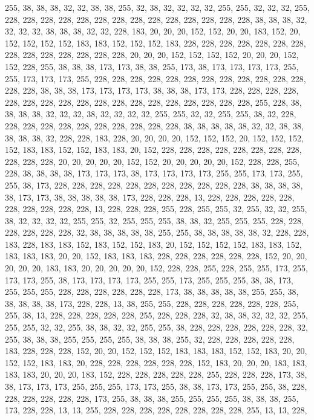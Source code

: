 {	255, 38,  38,  38,  32,  32,  38,  38,  255, 32,  38,  32,  32,  32,  32,  255, 255, 32,  32,  32,  255, 228, 228, 228, 228, 228, 228, 228, 228, 228, 228, 228, 228, 228, 228, 38,  38,  38,  32,  32,  32,  32,  38,  38,  38,  32,  32,  228, 183, 20,  20,  20,  152, 152, 20,  20,  183, 152, 20,  152, 152, 152, 152, 183, 183, 152, 152, 152, 183, 228, 228, 228, 228, 228, 228, 228, 228, 228, 228, 228, 228, 228, 228, 20,  20,  20,  152, 152, 152, 152, 20,  20,  20,  152, 152, 228, 255, 38,  38,  38,  173, 173, 38,  38,  255, 173, 38,  173, 173, 173, 173, 255, 255, 173, 173, 173, 255, 228, 228, 228, 228, 228, 228, 228, 228, 228, 228, 228, 228, 228, 228, 38,  38,  38,  173, 173, 173, 173, 38,  38,  38,  173, 173, 228, 228, 228, 228, 228, 228, 228, 228, 228, 228, 228, 228, 228, 228, 228, 228, 228, 
	228, 255, 228, 38,  38,  38,  38,  32,  32,  32,  38,  32,  32,  32,  32,  255, 255, 32,  32,  255, 255, 38,  32,  228, 228, 228, 228, 228, 228, 228, 228, 228, 228, 228, 38,  38,  38,  38,  38,  32,  32,  38,  38,  38,  38,  38,  32,  228, 228, 183, 228, 20,  20,  20,  20,  152, 152, 152, 20,  152, 152, 152, 152, 183, 183, 152, 152, 183, 183, 20,  152, 228, 228, 228, 228, 228, 228, 228, 228, 228, 228, 228, 20,  20,  20,  20,  20,  152, 152, 20,  20,  20,  20,  20,  152, 228, 228, 255, 228, 38,  38,  38,  38,  173, 173, 173, 38,  173, 173, 173, 173, 255, 255, 173, 173, 255, 255, 38,  173, 228, 228, 228, 228, 228, 228, 228, 228, 228, 228, 228, 38,  38,  38,  38,  38,  173, 173, 38,  38,  38,  38,  38,  173, 228, 228, 228, 13,  228, 228, 228, 228, 228, 228, 228, 228, 228, 228, 13,  228, 228, 
	228, 255, 228, 255, 255, 32,  255, 32,  32,  255, 38,  32,  32,  32,  32,  255, 255, 32,  255, 255, 255, 38,  38,  32,  255, 255, 255, 228, 228, 228, 228, 228, 228, 32,  38,  38,  38,  38,  38,  255, 255, 38,  38,  38,  38,  38,  32,  228, 228, 183, 228, 183, 183, 152, 183, 152, 152, 183, 20,  152, 152, 152, 152, 183, 183, 152, 183, 183, 183, 20,  20,  152, 183, 183, 183, 228, 228, 228, 228, 228, 228, 152, 20,  20,  20,  20,  20,  183, 183, 20,  20,  20,  20,  20,  152, 228, 228, 255, 228, 255, 255, 173, 255, 173, 173, 255, 38,  173, 173, 173, 173, 255, 255, 173, 255, 255, 255, 38,  38,  173, 255, 255, 255, 228, 228, 228, 228, 228, 228, 173, 38,  38,  38,  38,  38,  255, 255, 38,  38,  38,  38,  38,  173, 228, 228, 13,  38,  255, 255, 228, 228, 228, 228, 228, 228, 255, 255, 38,  13,  228, 
	228, 228, 228, 228, 255, 228, 228, 228, 32,  38,  38,  32,  32,  32,  255, 255, 255, 32,  32,  255, 38,  38,  32,  32,  255, 255, 38,  228, 228, 228, 228, 228, 228, 32,  255, 38,  38,  38,  255, 255, 255, 255, 38,  38,  38,  255, 32,  228, 228, 228, 228, 228, 183, 228, 228, 228, 152, 20,  20,  152, 152, 152, 183, 183, 183, 152, 152, 183, 20,  20,  152, 152, 183, 183, 20,  228, 228, 228, 228, 228, 228, 152, 183, 20,  20,  20,  183, 183, 183, 183, 20,  20,  20,  183, 152, 228, 228, 228, 228, 228, 255, 228, 228, 228, 173, 38,  38,  173, 173, 173, 255, 255, 255, 173, 173, 255, 38,  38,  173, 173, 255, 255, 38,  228, 228, 228, 228, 228, 228, 173, 255, 38,  38,  38,  255, 255, 255, 255, 38,  38,  38,  255, 173, 228, 228, 13,  13,  255, 228, 228, 228, 228, 228, 228, 228, 228, 255, 13,  13,  228, 
}
